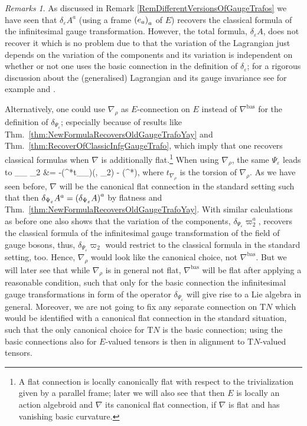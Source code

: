 \documentclass[a4paper,oneside,11pt,leqno]{scrartcl} %
\def\ba#1\ea{\begin{align}#1\end{align}}
\theoremstyle{plain}
\theoremstyle{remark}
\newtheorem{remark}[theorem]{Remarks}
\theoremstyle{definition}
\begin{document}
\begin{remark}\label{WhyNablaBasPartOne}
\leavevmode\newline
As discussed in Remark \ref{RemDifferentVersionsOfGaugeTrafos} we have seen that $\delta_\varepsilon A^a$ (using a frame $\mleft( e_a \mright)_a$ of $E$) recovers the classical formula of the infinitesimal gauge transformation. However, the total formula, $\delta_\varepsilon A$, does not recover it which is no problem due to that the variation of the Lagrangian just depends on the variation of the components and its variation is independent on whether or not one uses the basic connection in the definition of $\delta_\varepsilon$; for a rigorous discussion about the (generalised) Lagrangian and its gauge invariance see for example \cite{CurvedYMH} and \cite[\S 4]{MyThesis}.

Alternatively, one could use $\nabla_\rho$ as $E$-connection on $E$ instead of $\nabla^{\mathrm{bas}}$ for the definition of $\delta_{\Psi_\varepsilon}$; especially because of results like Thm.~\ref{thm:NewFormulaRecoversOldGaugeTrafoYay} and Thm.~\ref{thm:RecoverOfClassicInfgGaugeTrafo}, which imply that one recovers classical formulas when $\nabla$ is additionally flat.\footnote{A flat connection is locally canonically flat with respect to the trivialization given by a parallel frame; later we will also see that then $E$ is locally an action algebroid and $\nabla$ its canonical flat connection, if $\nabla$ is flat and has vanishing basic curvature.} When using $\nabla_\rho$, the same $\Psi_\varepsilon$ leads to
\ba
\delta_{\Psi_\varepsilon} \varpi_2
&=
-({}^*t_{\nabla_\rho})(\varepsilon, \varpi_2) - ({}^*\nabla)\varepsilon,
\ea
where $t_{\nabla_\rho}$ is the torsion of $\nabla_\rho$. As we have seen before, $\nabla$ will be the canonical flat connection in the standard setting such that then $\delta_{\Psi_\varepsilon} A^a = \mleft(\delta_{\Psi_\varepsilon} A \mright)^a$ by flatness and Thm.~\ref{thm:NewFormulaRecoversOldGaugeTrafoYay}. With similar calculations as before one also shows that the variation of the components, $\delta_{\Psi_\varepsilon} \varpi_2^a$, recovers the classical formula of the infinitesimal gauge transformation of the field of gauge bosons, thus, $\delta_{\Psi_\varepsilon} \varpi_2$ would restrict to the classical formula in the standard setting, too. Hence, $\nabla_\rho$ would look like the canonical choice, not $\nabla^{\mathrm{bas}}$. But we will later see that while $\nabla_\rho$ is in general not flat, $\nabla^{\mathrm{bas}}$ will be flat after applying a reasonable condition, such that only for the basic connection the infinitesimal gauge transformations in form of the operator $\delta_{\Psi_\varepsilon}$ will give rise to a Lie algebra in general. Moreover, we are not going to fix any separate connection on $\mathrm{T}N$ which would be identified with a canonical flat connection in the standard situation, such that the only canonical choice for $\mathrm{T}N$ is the basic connection; using the basic connections also for $E$-valued tensors is then in alignment to $\mathrm{T}N$-valued tensors.
\end{remark}
\end{document}

